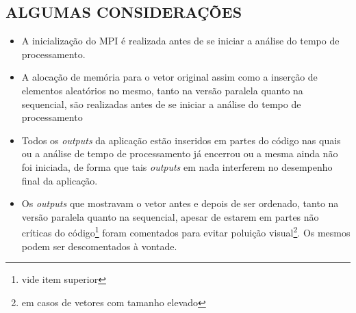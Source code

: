 \subsection{\normalsize ALGUMAS CONSIDERAÇÕES}
	\begin{itemize}
		\item A inicialização do MPI é realizada antes de se iniciar a análise do tempo de processamento.
		
		\item A alocação de memória para o vetor original assim como a inserção de elementos aleatórios no mesmo, tanto na versão paralela quanto na sequencial, são realizadas antes de se iniciar a análise do tempo de processamento 

		\item Todos os \textit{outputs} da aplicação estão inseridos em partes do código nas quais ou a análise de tempo de processamento já encerrou ou a mesma ainda não foi iniciada, de forma que tais \textit{outputs} em nada interferem no desempenho final da aplicação.

		\item Os \textit{outputs} que mostravam o vetor antes e depois de ser ordenado, tanto na versão paralela quanto na sequencial, apesar de estarem em partes não críticas do código\footnote{vide item superior} foram comentados para evitar poluição visual\footnote{em casos de vetores com tamanho elevado}. Os mesmos podem ser descomentados à vontade.
	\end{itemize}